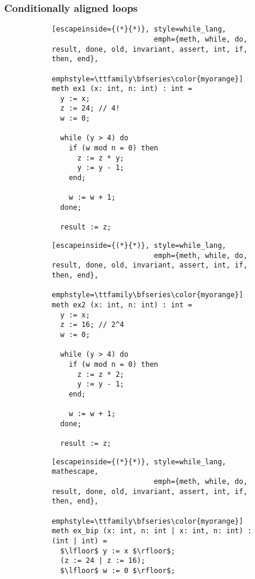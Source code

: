 \FloatBarrier
\subsubsection{Conditionally aligned loops}
\label{subsubsec:cond_align_loops_example}

\begin{figure}[h]
  \centering

  \begin{subfigure}[t]{0.49\textwidth}
    \centering
    \noindent
    \begin{lstlisting}[escapeinside={(*}{*)}, style=while_lang,
                        emph={meth, while, do, result, done, old, invariant, assert, int, if, then, end},
                        emphstyle=\ttfamily\bfseries\color{myorange}]
meth ex1 (x: int, n: int) : int =
  y := x;
  z := 24; // 4!
  w := 0;

  while (y > 4) do
    if (w mod n = 0) then
      z := z * y;
      y := y - 1;
    end;

    w := w + 1;
  done;

  result := z;
    \end{lstlisting}
  \end{subfigure}
  \hfill
  \begin{subfigure}[t]{0.49\textwidth}
    \centering
    \noindent
    \begin{lstlisting}[escapeinside={(*}{*)}, style=while_lang,
                        emph={meth, while, do, result, done, old, invariant, assert, int, if, then, end},
                        emphstyle=\ttfamily\bfseries\color{myorange}]
meth ex2 (x: int, n: int) : int =
  y := x;
  z := 16; // 2^4
  w := 0;

  while (y > 4) do
    if (w mod n = 0) then
      z := z * 2;
      y := y - 1;
    end;

    w := w + 1;
  done;

  result := z;
    \end{lstlisting}
  \end{subfigure}
  \hfill
  \begin{subfigure}[t]{0.99\textwidth}
    \centering
    \noindent
    \begin{lstlisting}[escapeinside={(*}{*)}, style=while_lang, mathescape,
                        emph={meth, while, do, result, done, old, invariant, assert, int, if, then, end},
                        emphstyle=\ttfamily\bfseries\color{myorange}]
meth ex_bip (x: int, n: int | x: int, n: int) : (int | int) =
  $\lfloor$ y := x $\rfloor$;
  (z := 24 | z := 16);
  $\lfloor$ w := 0 $\rfloor$;


\end{lstlisting}
\end{subfigure}
\end{figure}
